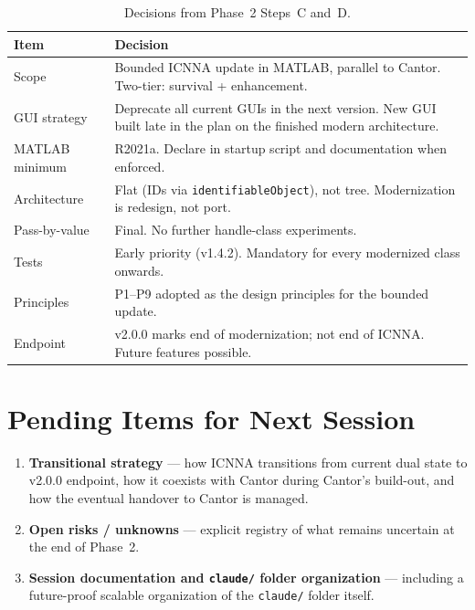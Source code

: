 \documentclass[11pt,a4paper]{article}
\begin{document}
\begin{table}[h]
\centering
\begin{tabular}{lp{10cm}}
\toprule
\textbf{Item} & \textbf{Decision} \\
\midrule
Scope & Bounded ICNNA update in MATLAB, parallel to Cantor. Two-tier: survival + enhancement. \\
GUI strategy & Deprecate all current GUIs in the next version. New GUI built late in the plan on the finished modern architecture. \\
MATLAB minimum & R2021a. Declare in startup script and documentation when enforced. \\
Architecture & Flat (IDs via \texttt{identifiableObject}), not tree. Modernization is redesign, not port. \\
Pass-by-value & Final. No further handle-class experiments. \\
Tests & Early priority (v1.4.2). Mandatory for every modernized class onwards. \\
Principles & P1--P9 adopted as the design principles for the bounded update. \\
Endpoint & v2.0.0 marks end of modernization; not end of ICNNA. Future features possible. \\
\bottomrule
\end{tabular}
\caption{Decisions from Phase~2 Steps~C and~D.}
\end{table}

\section{Pending Items for Next Session}

\begin{enumerate}[label=\textbf{Step~\Alph*:},start=5]
    \item \textbf{Transitional strategy} --- how ICNNA transitions from current dual state to v2.0.0 endpoint, how it coexists with Cantor during Cantor's build-out, and how the eventual handover to Cantor is managed.
    \item \textbf{Open risks / unknowns} --- explicit registry of what remains uncertain at the end of Phase~2.
    \item \textbf{Session documentation and \texttt{claude/} folder organization} --- including a future-proof scalable organization of the \texttt{claude/} folder itself.
\end{enumerate}
\end{document}
